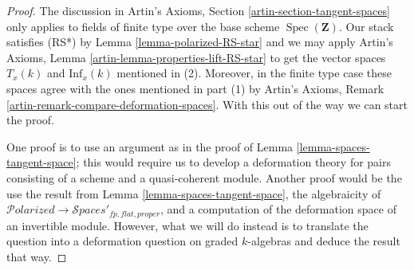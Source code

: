 \documentclass{stacks-project}
\theoremstyle{plain}
\theoremstyle{definition}
\theoremstyle{remark}
\numberwithin{equation}{subsection}
\def\Spec{\mathop{\mathrm{Spec}}}
\def\Spacesstack{\mathcal{S}\!\mathit{paces}}
\def\Polarizedstack{\mathcal{P}\!\mathit{olarized}}
\begin{document}
\begin{proof}
The discussion in Artin's Axioms, Section \ref{artin-section-tangent-spaces}
only applies to fields of finite type over the base scheme $\Spec(\mathbf{Z})$.
Our stack satisfies (RS*) by Lemma \ref{lemma-polarized-RS-star}
and we may apply
Artin's Axioms, Lemma \ref{artin-lemma-properties-lift-RS-star}
to get the vector spaces $T_x(k)$ and $\text{Inf}_x(k)$
mentioned in (2). Moreover, in the finite type case these spaces agree with the
ones mentioned in part (1)
by Artin's Axioms, Remark \ref{artin-remark-compare-deformation-spaces}.
With this out of the way we can start the proof.

\medskip\noindent
One proof is to use an argument as in the proof of
Lemma \ref{lemma-spaces-tangent-space}; this would
require us to develop a deformation theory for pairs
consisting of a scheme and a quasi-coherent module.
Another proof would be the use the result from
Lemma \ref{lemma-spaces-tangent-space},
the algebraicity of
$\Polarizedstack \to \Spacesstack'_{fp, flat, proper}$,
and a computation of the deformation space of an
invertible module. However, what we will do instead
is to translate the question into a deformation question
on graded $k$-algebras and deduce the result that way.


\end{proof}
\end{document}
